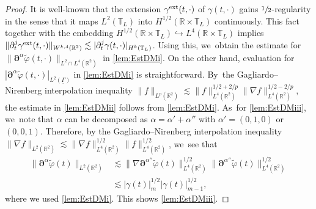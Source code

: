 \documentclass[10pt]{amsart}
\newcommand{\R}{{\mathbb R}}
\newcommand{\dt}{\partial_t}
\newcommand{\ul}[1]{\underline{#1}}
\newcommand{\itGamma}{\mathit{\Gamma}}
\theoremstyle{definition}
\begin{document}
\begin{proof}
It is well-known that the extension $\gamma^{\rm ext}(t,\cdot)$ of $\gamma(t,\cdot)$ gains $\sfrac12$-regularity in the sense that
it maps $L^2(\mathbb{T}_L)$ into $H^{1/2}(\R\times\mathbb{T}_L)$ continuously.
This fact together with the embedding $H^{1/2}(\R\times\mathbb{T}_L) \hookrightarrow L^4(\R\times\mathbb{T}_L)$ implies
$\|\dt^j\gamma^{\rm ext}(t,\cdot)\|_{W^{k,4}(\R^2)} \lesssim |\dt^j\gamma(t,\cdot)|_{H^k(\mathbb{T}_L)}$.
Using this, we~obtain the estimate for $\|\bm{\partial}^\alpha\widetilde{\varphi}(t,\cdot)\|_{L^2\cap L^4(\R^2)}$ in \eqref{lem:EstDMi}.
On the other hand, evaluation for $|\bm{\partial}^\alpha\widetilde{\varphi}(t,\cdot)|_{L^2(\ul{\itGamma})}$ in \eqref{lem:EstDMi} is straightforward. By~the Gagliardo--Nirenberg interpolation inequality $\|f\|_{L^p(\R^2)}\lesssim \|f\|_{L^4(\R^2)}^{1/2+2/p}\|\nabla f\|_{L^4(\R^2)}^{1/2-2/p}$,
the estimate in \eqref{lem:EstDMii} follows from \eqref{lem:EstDMi}. As~for \eqref{lem:EstDMiii}, we~note that $\alpha$ can be decomposed as $\alpha=\alpha'+\alpha''$ with $\alpha'=(0,1,0)$ or $(0,0,1)$.
Therefore, by the Gagliardo--Nirenberg interpolation inequality $\|\nabla f\|_{L^2(\R^2)} \lesssim \|\nabla f\|_{L^4(\R^2)}^{1/2} \|f\|_{L^4(\R^2)}^{1/2}$, we~see that
\begin{align*}
\|\bm{\partial}^\alpha\widetilde{\varphi}(t)\|_{L^2(\R^2)}
&\lesssim \|\nabla\bm{\partial}^{\alpha''}\widetilde{\varphi}(t)\|_{L^4(\R^2)}^{1/2} \|\bm{\partial}^{\alpha''}\widetilde{\varphi}(t)\|_{L^4(\R^2)}^{1/2} \\
&\lesssim |\gamma(t)|_m^{1/2} |\gamma(t)|_{m-1}^{1/2},
\end{align*}
where we used \eqref{lem:EstDMi}.
This shows \eqref{lem:EstDMiii}.
\end{proof}
\end{document}

